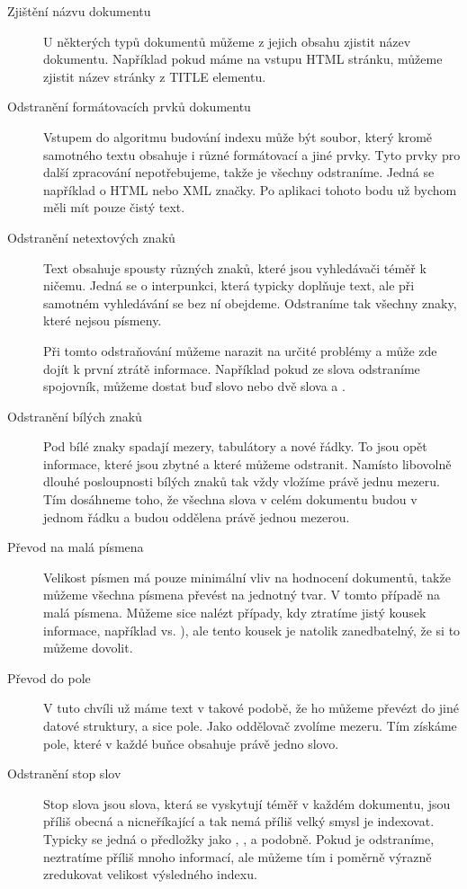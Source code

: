 \documentclass[12pt]{article}
\begin{document}
\begin{description}
\item[Zjištění názvu dokumentu] U některých typů dokumentů můžeme z jejich obsahu zjistit název dokumentu. Například pokud máme na vstupu HTML stránku, můžeme zjistit název stránky z TITLE elementu. 

\item[Odstranění formátovacích prvků dokumentu] Vstupem do algoritmu budování indexu může být soubor, který kromě samotného textu obsahuje i různé formátovací a jiné prvky. Tyto prvky pro další zpracování nepotřebujeme, takže je všechny odstraníme. Jedná se například o HTML nebo XML značky. Po aplikaci tohoto bodu už bychom měli mít pouze čistý text. 

\item[Odstranění netextových znaků] Text obsahuje spousty různých znaků, které jsou vyhledávači téměř k ničemu. Jedná se o interpunkci, která typicky doplňuje text, ale při samotném vyhledávání se bez ní obejdeme. Odstraníme tak všechny znaky, které nejsou písmeny. 

Při tomto odstraňování můžeme narazit na určité problémy a může zde dojít k první ztrátě informace. Například pokud ze slova  odstraníme spojovník, můžeme dostat buď slovo  nebo dvě slova  a . 

\item[Odstranění bílých znaků] Pod bílé znaky spadají mezery, tabulátory a nové řádky. To jsou opět informace, které jsou zbytné a které můžeme odstranit. Namísto libovolně dlouhé posloupnosti bílých znaků tak vždy vložíme právě jednu mezeru. Tím dosáhneme toho, že všechna slova v celém dokumentu budou v jednom řádku a budou oddělena právě jednou mezerou. 

\item[Převod na malá písmena] Velikost písmen má pouze minimální vliv na hodnocení dokumentů, takže můžeme všechna písmena převést na jednotný tvar. V tomto případě na malá písmena. Můžeme sice nalézt případy, kdy ztratíme jistý kousek informace, například  vs. ), ale tento kousek je natolik zanedbatelný, že si to můžeme dovolit. 

\item[Převod do pole] V tuto chvíli už máme text v takové podobě, že ho můžeme převézt do jiné datové struktury, a sice pole. Jako oddělovač zvolíme mezeru. Tím získáme pole, které v každé buňce obsahuje právě jedno slovo. 

\item[Odstranění stop slov] Stop slova jsou slova, která se vyskytují téměř v každém dokumentu, jsou příliš obecná a nicneříkající a tak nemá příliš velký smysl je indexovat. Typicky se jedná o předložky jako , ,  a podobně. Pokud je odstraníme, neztratíme příliš mnoho informací, ale můžeme tím i poměrně výrazně zredukovat velikost výsledného indexu. 


\end{description}
\end{document}
